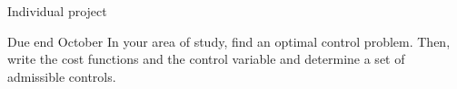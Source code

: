 \documentclass[color=usenames,dvipsnames]{beamer}
\begin{document}
\begin{frame}{Individual project}
\begin{block}{Due end October}
     In your area of study, find an optimal control problem. Then, write the cost functions and the control variable and determine a set of admissible controls. 
\end{block}
\end{frame}
\end{document}
